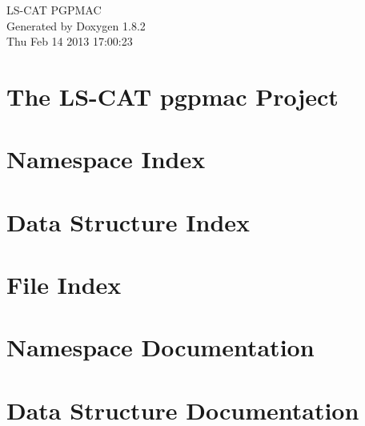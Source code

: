 \documentclass{book}
\begin{document}
\hypersetup{pageanchor=false,citecolor=blue}
\begin{titlepage}
\vspace*{7cm}
\begin{center}
{\Large L\-S-\/\-C\-A\-T P\-G\-P\-M\-A\-C }\\
\vspace*{1cm}
{\large Generated by Doxygen 1.8.2}\\
\vspace*{0.5cm}
{\small Thu Feb 14 2013 17:00:23}\\
\end{center}
\end{titlepage}
\clearemptydoublepage
{}
\tableofcontents
\clearemptydoublepage
{}
\hypersetup{pageanchor=true,citecolor=blue}
\chapter{The L\-S-\/\-C\-A\-T pgpmac Project}
\label{index}\hypertarget{index}{}
\chapter{Namespace Index}

\chapter{Data Structure Index}

\chapter{File Index}

\chapter{Namespace Documentation}


\chapter{Data Structure Documentation}






























\end{document}
